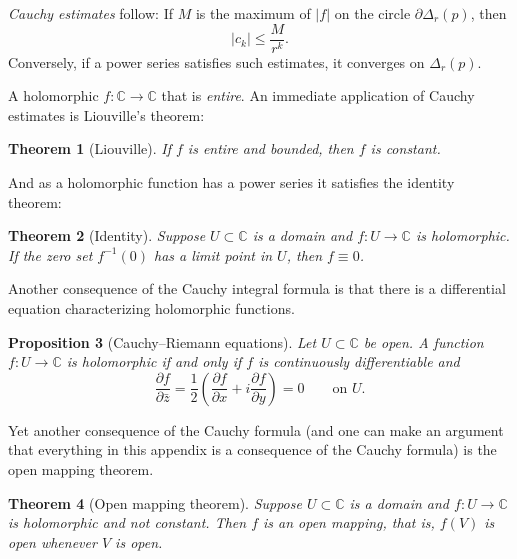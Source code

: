 \documentclass[12pt,openany]{book}
\newcommand{\sabs}[1]{\lvert {#1} \rvert}
\newcommand{\C}{{\mathbb{C}}}
\newcommand{\myindex}[1]{#1\index{#1}}
\theoremstyle{plain}
\newtheorem{thm}{Theorem}[section]
\newtheorem{prop}[thm]{Proposition}
\theoremstyle{remark}
\theoremstyle{definition}
\theoremstyle{exercise}
\theoremstyle{example}
\begin{document}
\emph{\myindex{Cauchy estimates}} follow:  If $M$
is the maximum of $\sabs{f}$ on the circle $\partial \Delta_r(p)$, then
\begin{equation*}
\sabs{c_k} \leq \frac{M}{r^k} .
\end{equation*}
Conversely, if a power series satisfies such estimates,
it converges on $\Delta_r(p)$.

A holomorphic $f \colon \C \to \C$ that is
\emph{\myindex{entire}}.  An immediate application of Cauchy estimates
is Liouville's theorem:

\begin{thm}[Liouville]
If $f$ is entire and bounded, then $f$ is constant.
\end{thm}

And as a holomorphic function has a power series it satisfies the
identity theorem:

\begin{thm}[Identity] \label{thm:onevaridentity}
Suppose $U \subset \C$ is a domain and $f \colon U \to \C$ is holomorphic.
If the zero set $f^{-1}(0)$ has a limit point in $U$, then
$f \equiv 0$.
\end{thm}

Another consequence  of the Cauchy integral formula is that there is
a differential equation characterizing holomorphic functions.

\begin{prop}[Cauchy--Riemann equations]
Let $U \subset \C$ be open.
A function $f \colon U \to \C$ is holomorphic if and only if
$f$ is continuously differentiable and
\begin{equation*}
\frac{\partial f}{\partial \bar{z}}
=
\frac{1}{2}
\left(
\frac{\partial f}{\partial x} + i
\frac{\partial f}{\partial y}
\right)
 = 0 \qquad \text{on $U$.}
\end{equation*}
\end{prop}

Yet another consequence of the Cauchy formula (and one can make an argument
that everything in this appendix is a consequence of the Cauchy formula)
is the open mapping theorem.

\begin{thm}[Open mapping theorem]
Suppose $U \subset \C$ is a domain and
$f \colon U \to \C$ is holomorphic and not constant.
Then $f$ is an open mapping, that is,
$f(V)$ is open whenever $V$ is open.
\end{thm}
\end{document}
